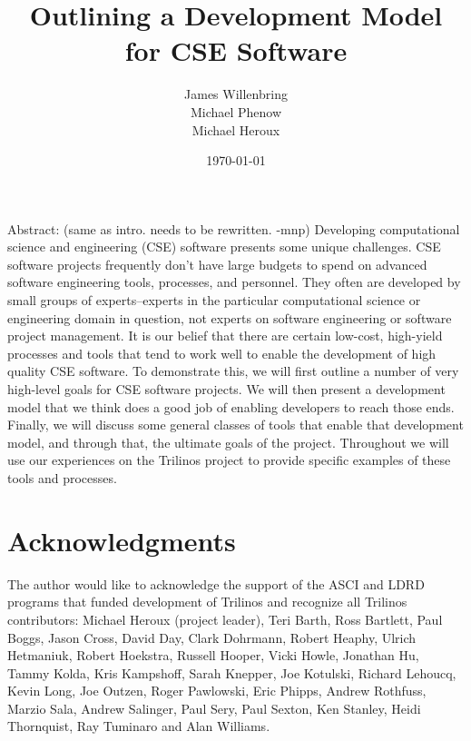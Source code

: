 \documentclass[12pt,relax]{article}
\title{Outlining a Development Model for CSE Software}
\author{
James Willenbring\\
Michael Phenow\\
Michael Heroux\\
}
\date{\today} %
\begin{document}
\maketitle



Abstract:  (same as intro. needs to be rewritten.  -mnp)
Developing computational science and engineering (CSE) software presents some 
unique challenges.  CSE software projects frequently don't have large budgets 
to spend on advanced software engineering tools, processes, and personnel.  
They often are developed by small groups of experts--experts in the particular 
computational science or engineering domain in question, not experts on 
software engineering or software project management.  It is our belief that 
there are certain low-cost, high-yield processes and tools that tend to work 
well to enable the development of high quality CSE software.  To demonstrate 
this, we will first outline a number of very high-level goals for CSE software 
projects.  We will then present a development model that we think does a good 
job of enabling developers to reach those ends.  Finally, we will discuss some 
general classes of tools that enable that development model, and through that, 
the ultimate goals of the project.  Throughout we will use our experiences on 
the Trilinos project to provide specific examples of these tools and processes.


\clearpage


\section*{Acknowledgments}

The author would like to acknowledge the support of the ASCI and LDRD programs 
that funded development of Trilinos and recognize all Trilinos contributors:
Michael Heroux (project leader), Teri Barth, Ross Bartlett, Paul Boggs, Jason
Cross, David Day, Clark Dohrmann, Robert Heaphy, Ulrich Hetmaniuk, Robert
Hoekstra, Russell Hooper, Vicki Howle, Jonathan Hu, Tammy Kolda, Kris
Kampshoff, Sarah Knepper, Joe Kotulski, Richard Lehoucq, Kevin Long, Joe
Outzen, Roger Pawlowski, Eric Phipps, Andrew Rothfuss, Marzio Sala, Andrew
Salinger, Paul Sery, Paul Sexton, Ken Stanley, Heidi Thornquist, Ray Tuminaro
and Alan Williams.
\end{document}
